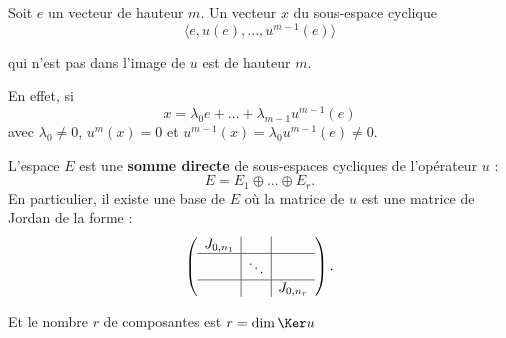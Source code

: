 \documentclass[class=report,crop=false]{standalone}
\begin{document}
\begin{remarque*}[importante]
Soit $e$ un vecteur de hauteur $m$. Un vecteur $x $ du sous-espace cyclique 
\[\langle e,u(e),...,u^{m-1}(e)\rangle\]

qui n'est pas dans l'image de $u$ est de hauteur $m$.

En effet, si \[x = \lambda_0 e + ... + \lambda_{m-1}u^{m-1}(e)\]
avec $\lambda_0 \neq 0$, $u^m(x) = 0$ et $u^{m-1}(x) = \lambda_0u^{m-1}(e) \neq 0$.
\end{remarque*}

\begin{theoreme}\label{thm:jnilpo}
L'espace $E$ est une {\bf somme directe} de sous-espaces cycliques de l'opérateur $u$ :
\[E = E_1 \oplus ... \oplus E_r .\] En particulier, il existe une base de $E$ où la matrice de $u$ est une matrice de Jordan de la forme :
\[ \left(\begin{array}{c|c|c}
J_{0,n_1}&&\\\hline
&\ddots&\\\hline
&&J_{0,n_r}
\end{array}\right).\]

Et le nombre $r$ de composantes est $r = \dim \Ker u$
\end{theoreme}
\end{document}
